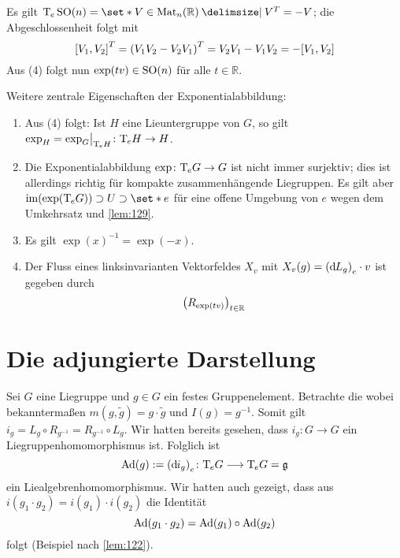 \begin{beispiel*}[{name=[Liealgebra von $\SO(n)$]}]
	Es gilt $\Tmap_e\SO(n) = \set*{V \in \Mat_n(\mathbb{R}) \given V^T =-V}$; die Abgeschlossenheit folgt mit
	\[
		\benbrace*{V_1,V_2}^T = \enbrace*{V_1 V_2 - V_2 V_1}^T = V_2 V_1 - V_1 V_2 = -\benbrace*{V_1,V_2}
	\]
	Aus (4) folgt nun $\exp(tv) \in \SO(n)$ für alle $t \in \mathbb{R}$.
\end{beispiel*}

\begin{bemerkung*}[{name=[weitere Eigenschaften der Exponentialabbildung]}]
	Weitere zentrale Eigenschaften der Exponentialabbildung:
	\begin{enumerate}[1)]
		\item Aus (4) folgt: Ist $H$ eine Lieuntergruppe von $G$, so gilt $\exp_H  = \exp_G\!\big|_{\Tmap_e H} \colon \Tmap_e H \to H$.
		\item Die Exponentialabbildung $\exp \colon \Tmap_e G \to G$ ist nicht immer surjektiv; dies ist allerdings richtig für kompakte zusammenhängende Liegruppen.
		Es gilt aber $\im \enbrace*{\exp (\Tmap_e G)} \supset U \supset \set*{e}$ für eine offene Umgebung von $e$ wegen dem Umkehrsatz und \cref{lem:129}.
		\item Es gilt $\exp(x)^{-1} = \exp(-x)$.
		\item Der Fluss eines linksinvarianten Vektorfeldes $X_v$ mit $X_v(g) = \enbrace*{\mathd L_g}_e \cdot v$ ist gegeben durch
		\[
			\enbrace*{R_{\exp(tv)}}_{t \in \mathbb{R}}
		\]
	\end{enumerate}
\end{bemerkung*}

\section{Die adjungierte Darstellung} %
\label{sec:15}
Sei $G$ eine Liegruppe und $g \in G$ ein festes Gruppenelement. Betrachte die 
wobei bekanntermaßen $m(g,\tilde{g})= g \cdot \tilde{g}$ und $I(g)=g^{-1}$. 
Somit gilt $i_g = L_g \circ R_{g^{-1}} = R_{g^{-1}} \circ L_g$.
Wir hatten bereits gesehen, dass $i_g \colon G \to G$ ein Liegruppenhomomorphismus ist.
Folglich ist 
\[
	\Ad(g) := \enbrace*{\mathd i_g}_e \colon \Tmap_e G \longrightarrow \Tmap_eG = \mathfrak{g}
\]
ein Liealgebrenhomomorphismus.
Wir hatten auch gezeigt, dass aus $i(g_1 \cdot g_2) = i(g_1) \cdot i(g_2)$ die Identität 
\[
	\Ad(g_1 \cdot g_2) = \Ad(g_1) \circ \Ad(g_2)
\]
folgt (Beispiel nach \cref{lem:122}).

